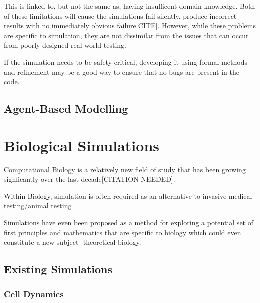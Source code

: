\documentclass{UoYCSproject}
\begin{document}
This is linked to, but not the same as, having insufficent domain knowledge. Both of these limitations will cause the simulations fail silently, produce incorrect results with no immediately obvious failure[CITE]. However, while these problems are specific to simulation, they are not dissimilar from the issues that can occur from poorly designed real-world testing. %

If the simulation needs to be safety-critical, developing it using formal methods and refinement may be a good way to ensure that no bugs are present in the code.

\subsection{Agent-Based Modelling}
\label{abm}


\section{Biological Simulations}
Computational Biology is a relatively new field of study that has been growing signficantly over the last decade[CITATION NEEDED].

Within Biology, simulation is often required as an alternative to invasive medical testing/animal testing


Simulations have even been proposed as a method for exploring a potential set of first principles and mathematics that are specific to biology which could even constitute a new subject- theoretical biology\cite{rise_article}.

\subsection{Existing Simulations}

\subsubsection{Cell Dynamics}
\end{document}
